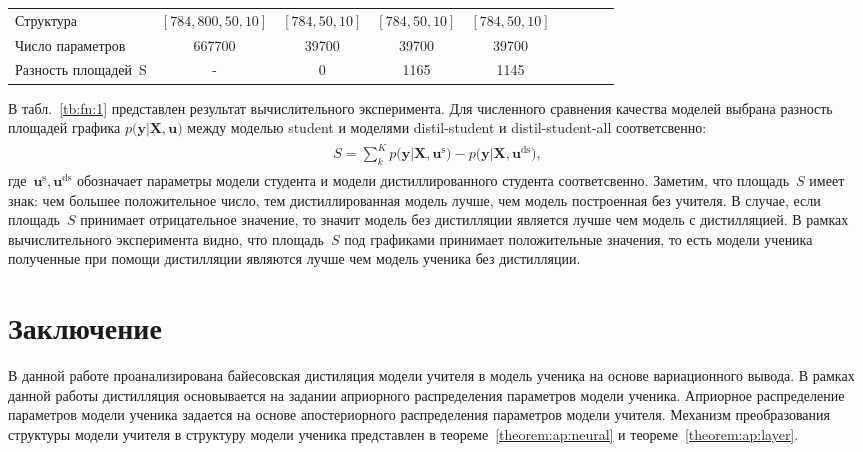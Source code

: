 \documentclass[12pt]{a&t}
\begin{document}
\begin{table}[]
\begin{center}
\begin{tabular}{|l|c|c|c|c|llll}
Структура           & $[784,800,50,10]$& $[784,50,10]$   & $[784,50,10]$  & $[784,50,10]$      &                      &                      &                      &                      \\ \cline{1-5}
Число параметров    &           667700                  &          39700                &         39700                &                 39700            &                      &                      &                      &                      \\ \cline{1-5}
Разность площадей~S   & -                           & 0                       &  1165               & 1145                    &                      &                      &                      &                      \\ \cline{1-5}
\end{tabular}
\end{center}
\end{table}

В табл.~\ref{tb:fn:1} представлен результат вычислительного эксперимента. Для численного сравнения качества моделей выбрана разность площадей графика $p\bigr(\mathbf{y}|\mathbf{X}, \mathbf{u}\bigr)$ между моделью student и моделями distil-student  и 
distil-student-all соответсвенно:
\begin{gather}
\label{eq:ex:8}
\begin{aligned}
S = \sum_{k}^{K} p\bigr(\mathbf{y}|\mathbf{X}, \mathbf{u}^{\text{s}}\bigr) - p\bigr(\mathbf{y}|\mathbf{X}, \mathbf{u}^{\text{ds}}\bigr),
\end{aligned}
\end{gather}
где~$\mathbf{u}^{\text{s}}, \mathbf{u}^{\text{ds}}$ обозначает параметры модели студента и модели дистиллированного студента соответсвенно. Заметим, что площадь~$S$ имеет знак: чем большее положительное число, тем дистиллированная модель лучше, чем модель построенная без учителя. В случае, если площадь~$S$ принимает отрицательное значение, то значит модель без дистилляции является лучше чем модель с дистилляцией. В рамках вычислительного эксперимента видно, что площадь~$S$ под графиками принимает положительные значения, то есть модели ученика полученные при помощи дистилляции являются лучше чем модель ученика без дистилляции.

\section{Заключение}

В данной работе проанализирована байесовская дистиляция модели учителя в модель ученика на основе вариационного вывода.
В рамках данной работы дистилляция основывается на задании априорного распределения параметров модели ученика.
Априорное распределение параметров модели ученика задается на основе апостериорного распределения параметров модели учителя.
Механизм преобразования структуры модели учителя в структуру модели ученика представлен в теореме~\ref{theorem:ap:neural} и теореме~\ref{theorem:ap:layer}.
\end{document}

